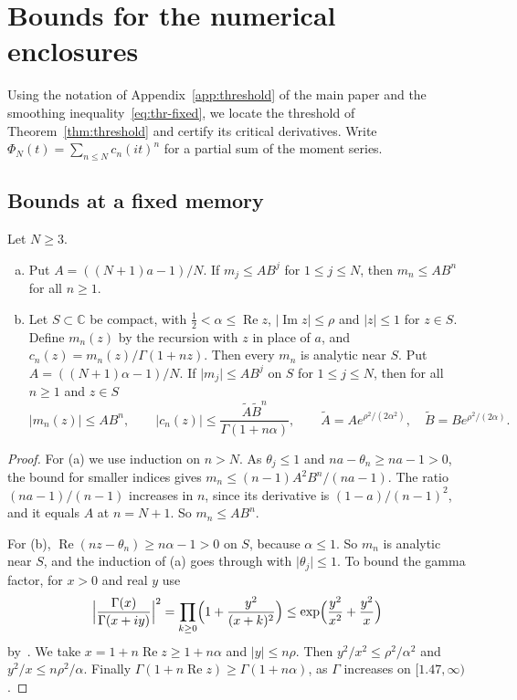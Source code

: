 \section{Bounds for the numerical enclosures}\label{or:threshold}

Using the notation of Appendix~\ref{app:threshold} of the main paper and the smoothing
inequality~\eqref{eq:thr-fixed}, we locate the threshold of
Theorem~\ref{thm:threshold} and certify its critical derivatives.
Write $\Phi_N(t)=\sum_{n\le N}c_n(it)^n$ for a partial sum of the
moment series.

\subsection{Bounds at a fixed memory}

\begin{lemma}\label{lem:thr-moments}
Let $N\ge3$.
\begin{enumerate}[(a)]
\item Put $A=((N+1)a-1)/N$. If $m_j\le AB^j$ for $1\le j\le N$, then
$m_n\le AB^n$ for all $n\ge1$.
\item Let $S\subset\mathbb C$ be compact, with $\frac12<\alpha\le\operatorname{Re}z$,
$\lvert\operatorname{Im}z\rvert\le\rho$ and $\lvert z\rvert\le1$ for $z\in S$.
Define $m_n(z)$ by the recursion with $z$ in place of $a$, and
$c_n(z)=m_n(z)/\Gamma(1+nz)$. Then every $m_n$ is analytic near $S$. Put
$A=((N+1)\alpha-1)/N$. If $\lvert m_j\rvert\le AB^j$ on $S$ for $1\le j\le N$,
then for all $n\ge1$ and $z\in S$
\[
 \lvert m_n(z)\rvert\le AB^n,\qquad
 \lvert c_n(z)\rvert\le\frac{\tilde A\tilde B^n}{\Gamma(1+n\alpha)},\qquad
 \tilde A=Ae^{\rho^2/(2\alpha^2)},\quad \tilde B=Be^{\rho^2/(2\alpha)} .
\]
\end{enumerate}
\end{lemma}

\begin{proof}
For (a) we use induction on $n>N$. As $\theta_j\le1$ and
$na-\theta_n\ge na-1>0$, the bound for smaller indices gives
$m_n\le(n-1)A^2B^n/(na-1)$. The ratio $(na-1)/(n-1)$ increases in $n$, since
its derivative is $(1-a)/(n-1)^2$, and it equals $A$ at $n=N+1$. So
$m_n\le AB^n$.

For (b), $\operatorname{Re}(nz-\theta_n)\ge n\alpha-1>0$ on $S$, because
$\alpha\le1$. So $m_n$ is analytic near $S$, and the induction of (a) goes
through with $\lvert\theta_j\rvert\le1$. To bound the gamma factor, for $x>0$ and real $y$ use
\[
 \Bigl\lvert\frac{\Gamma(x)}{\Gamma(x+iy)}\Bigr\rvert^2
 =\prod_{k\ge0}\Bigl(1+\frac{y^2}{(x+k)^2}\Bigr)
 \le\exp\Bigl(\frac{y^2}{x^2}+\frac{y^2}x\Bigr)
\]
by~\cite[5.8.3]{dlmf}. We take $x=1+n\operatorname{Re}z\ge1+n\alpha$ and
$\lvert y\rvert\le n\rho$. Then $y^2/x^2\le\rho^2/\alpha^2$ and
$y^2/x\le n\rho^2/\alpha$. Finally
$\Gamma(1+n\operatorname{Re}z)\ge\Gamma(1+n\alpha)$, as $\Gamma$ increases on
$[1.47,\infty)$.
\end{proof}

